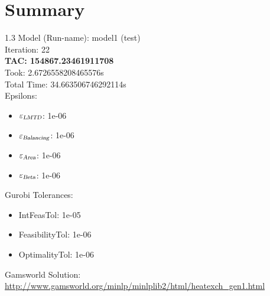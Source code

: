 \documentclass{article}%
\begin{document}
%
\normalsize%
\section{Summary}%
\thispagestyle{plain}%
\begin{spacing}{1.3}%
\Large%
Model (Run-name): model1 (test)\\%
Iteration: 22\\%
\textbf{TAC: 154867.23461911708}\\%
Took: 2.6726558208465576s\\%
Total Time: 34.663506746292114s\\%
Epsilons:%
\begin{itemize}%
	\item $\varepsilon_{\textsl{LMTD}}$: 1e-06%
	\item $\varepsilon_{\textsl{Balancing}}$: 1e-06%
	\item $\varepsilon_{\textsl{Area}}$: 1e-06%
	\item $\varepsilon_{\textsl{Beta}}$: 1e-06%
\end{itemize}%
Gurobi Tolerances:%
\begin{itemize}%
	\item IntFeasTol: 1e-05%
	\item FeasibilityTol: 1e-06%
	\item OptimalityTol: 1e-06%
\end{itemize}%
\end{spacing}%
\normalsize%
Gamsworld Solution: \url{http://www.gamsworld.org/minlp/minlplib2/html/heatexch_gen1.html}%
%
\clearpage%
\end{document}
